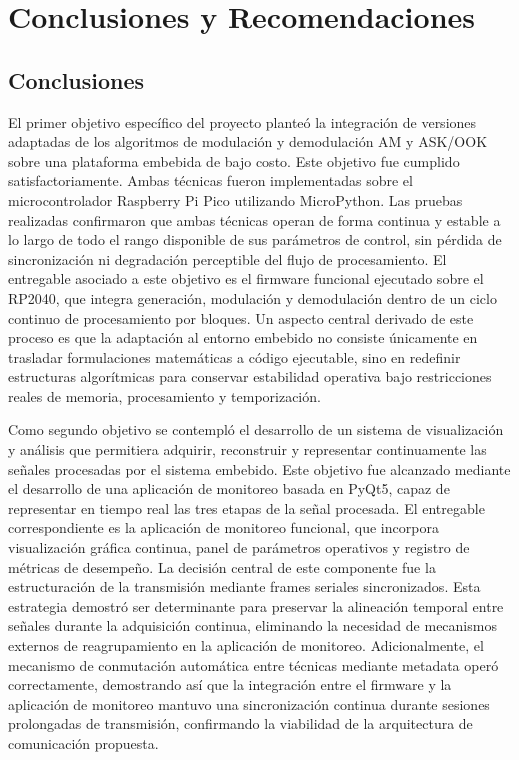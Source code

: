 \chapter{Conclusiones y Recomendaciones}

\section{Conclusiones}

El primer objetivo específico del proyecto planteó la integración de versiones adaptadas de los algoritmos de modulación y demodulación AM y ASK/OOK sobre una plataforma embebida de bajo costo. Este objetivo fue cumplido satisfactoriamente. Ambas técnicas fueron implementadas sobre el microcontrolador Raspberry Pi Pico utilizando MicroPython. Las pruebas realizadas confirmaron que ambas técnicas operan de forma continua y estable a lo largo de todo el rango disponible de sus parámetros de control, sin pérdida de sincronización ni degradación perceptible del flujo de procesamiento. El entregable asociado a este objetivo es el firmware funcional ejecutado sobre el RP2040, que integra generación, modulación y demodulación dentro de un ciclo continuo de procesamiento por bloques. Un aspecto central derivado de este proceso es que la adaptación al entorno embebido no consiste únicamente en trasladar formulaciones matemáticas a código ejecutable, sino en redefinir estructuras algorítmicas para conservar estabilidad operativa bajo restricciones reales de memoria, procesamiento y temporización.

Como segundo objetivo se contempló el desarrollo de un sistema de visualización y análisis que permitiera adquirir, reconstruir y representar continuamente las señales procesadas por el sistema embebido. Este objetivo fue alcanzado mediante el desarrollo de una aplicación de monitoreo basada en PyQt5, capaz de representar en tiempo real las tres etapas de la señal procesada. El entregable correspondiente es la aplicación de monitoreo funcional, que incorpora visualización gráfica continua, panel de parámetros operativos y registro de métricas de desempeño. La decisión central de este componente fue la estructuración de la transmisión mediante frames seriales sincronizados. Esta estrategia demostró ser determinante para preservar la alineación temporal entre señales durante la adquisición continua, eliminando la necesidad de mecanismos externos de reagrupamiento en la aplicación de monitoreo. Adicionalmente, el mecanismo de conmutación automática entre técnicas mediante metadata operó correctamente, demostrando así que la integración entre el firmware y la aplicación de monitoreo mantuvo una sincronización continua durante sesiones prolongadas de transmisión, confirmando la viabilidad de la arquitectura de comunicación propuesta.

